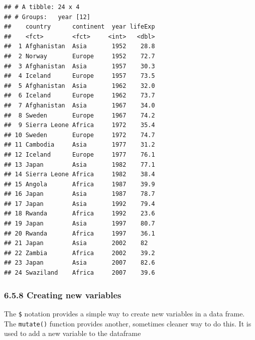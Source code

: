 \documentclass[]{article}
\newenvironment{Shaded}{\begin{snugshade}}{\end{snugshade}}
\newcommand{\KeywordTok}[1]{\textcolor[rgb]{0.13,0.29,0.53}{\textbf{#1}}}
\newcommand{\DataTypeTok}[1]{\textcolor[rgb]{0.13,0.29,0.53}{#1}}
\newcommand{\StringTok}[1]{\textcolor[rgb]{0.31,0.60,0.02}{#1}}
\newcommand{\OperatorTok}[1]{\textcolor[rgb]{0.81,0.36,0.00}{\textbf{#1}}}
\newcommand{\NormalTok}[1]{#1}
\begin{document}
\begin{verbatim}
## # A tibble: 24 x 4
## # Groups:   year [12]
##    country      continent  year lifeExp
##    <fct>        <fct>     <int>   <dbl>
##  1 Afghanistan  Asia       1952    28.8
##  2 Norway       Europe     1952    72.7
##  3 Afghanistan  Asia       1957    30.3
##  4 Iceland      Europe     1957    73.5
##  5 Afghanistan  Asia       1962    32.0
##  6 Iceland      Europe     1962    73.7
##  7 Afghanistan  Asia       1967    34.0
##  8 Sweden       Europe     1967    74.2
##  9 Sierra Leone Africa     1972    35.4
## 10 Sweden       Europe     1972    74.7
## 11 Cambodia     Asia       1977    31.2
## 12 Iceland      Europe     1977    76.1
## 13 Japan        Asia       1982    77.1
## 14 Sierra Leone Africa     1982    38.4
## 15 Angola       Africa     1987    39.9
## 16 Japan        Asia       1987    78.7
## 17 Japan        Asia       1992    79.4
## 18 Rwanda       Africa     1992    23.6
## 19 Japan        Asia       1997    80.7
## 20 Rwanda       Africa     1997    36.1
## 21 Japan        Asia       2002    82  
## 22 Zambia       Africa     2002    39.2
## 23 Japan        Asia       2007    82.6
## 24 Swaziland    Africa     2007    39.6
\end{verbatim}

\subsubsection{6.5.8 Creating new
variables}\label{creating-new-variables}

The \texttt{\$} notation provides a simple way to create new variables
in a data frame. The \texttt{mutate()} function provides another,
sometimes cleaner way to do this. It is used to add a new variable to
the dataframe

\begin{Shaded}
\end{Shaded}
\end{document}
